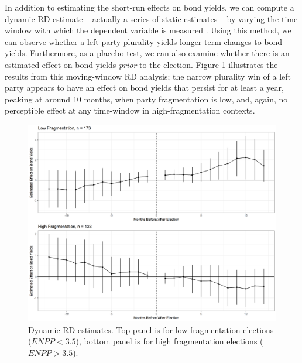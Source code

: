 \documentclass[12pt]{article}
\begin{document}
\begin{appendices}
        In addition to estimating the short-run effects on bond yields, we can compute a dynamic RD estimate -- actually a series of static estimates -- by varying the time window with which the dependent variable is measured \citep{Cellini2010}. Using this method, we can observe whether a left party plurality yields longer-term changes to bond yields. Furthermore, as a placebo test, we can also examine whether there is an estimated effect on bond yields \textit{prior} to the election. Figure \ref{fig:dynamicRD} illustrates the results from this moving-window RD analysis; the narrow plurality win of a left party appears to have an effect on bond yields that persist for at least a year, peaking at around 10 months, when party fragmentation is low, and, again, no perceptible effect at any time-window in high-fragmentation contexts. 

    \begin{figure} [h]
    	\centering
    	\includegraphics[width=\linewidth]{figures/Figure10.png}
    	\caption{Dynamic RD estimates. Top panel is for low fragmentation elections ($ENPP < 3.5$), bottom panel is for high fragmentation elections ($ENPP > 3.5$).}
    	\label{fig:dynamicRD}
    \end{figure}

\end{appendices}
\end{document}
